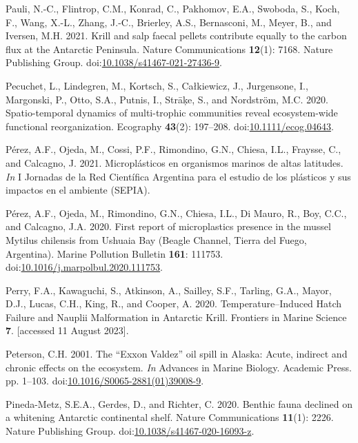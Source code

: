 \documentclass[
]{article}
\newlength{\cslhangindent}
\newenvironment{CSLReferences}[2] %
 {\begin{list}{}{%
  \setlength{\itemindent}{0pt}
  \setlength{\leftmargin}{0pt}
  \setlength{\parsep}{0pt}
  \ifodd #1
   \setlength{\leftmargin}{\cslhangindent}
   \setlength{\itemindent}{-1\cslhangindent}
  \fi
  \setlength{\itemsep}{#2\baselineskip}}}
 {\end{list}}
\begin{document}
\begin{CSLReferences}{1}{0}
Pauli, N.-C., Flintrop, C.M., Konrad, C., Pakhomov, E.A., Swoboda, S.,
Koch, F., Wang, X.-L., Zhang, J.-C., Brierley, A.S., Bernasconi, M.,
Meyer, B., and Iversen, M.H. 2021. Krill and salp faecal pellets
contribute equally to the carbon flux at the {Antarctic Peninsula}.
Nature Communications \textbf{12}(1): 7168. Nature Publishing Group.
doi:\href{https://doi.org/10.1038/s41467-021-27436-9}{10.1038/s41467-021-27436-9}.

Pecuchet, L., Lindegren, M., Kortsch, S., Całkiewicz, J., Jurgensone,
I., Margonski, P., Otto, S.A., Putnis, I., Strāķe, S., and Nordström,
M.C. 2020. Spatio-temporal dynamics of multi-trophic communities reveal
ecosystem-wide functional reorganization. Ecography \textbf{43}(2):
197--208.
doi:\href{https://doi.org/10.1111/ecog.04643}{10.1111/ecog.04643}.

Pérez, A.F., Ojeda, M., Cossi, P.F., Rimondino, G.N., Chiesa, I.L.,
Fraysse, C., and Calcagno, J. 2021. {Micropl{á}sticos en organismos
marinos de altas latitudes}. \emph{In} {I Jornadas de la Red
Cient{í}fica Argentina para el estudio de los pl{á}sticos y sus impactos
en el ambiente (SEPIA)}.

Pérez, A.F., Ojeda, M., Rimondino, G.N., Chiesa, I.L., Di Mauro, R.,
Boy, C.C., and Calcagno, J.A. 2020. First report of microplastics
presence in the mussel {Mytilus} chilensis from {Ushuaia Bay} ({Beagle
Channel}, {Tierra} del {Fuego}, {Argentina}). Marine Pollution Bulletin
\textbf{161}: 111753.
doi:\href{https://doi.org/10.1016/j.marpolbul.2020.111753}{10.1016/j.marpolbul.2020.111753}.

Perry, F.A., Kawaguchi, S., Atkinson, A., Sailley, S.F., Tarling, G.A.,
Mayor, D.J., Lucas, C.H., King, R., and Cooper, A. 2020.
Temperature--{Induced Hatch Failure} and {Nauplii Malformation} in
{Antarctic Krill}. Frontiers in Marine Science \textbf{7}. {[}accessed
11 August 2023{]}.

Peterson, C.H. 2001. The {``{Exxon Valdez}''} oil spill in {Alaska}:
{Acute}, indirect and chronic effects on the ecosystem. \emph{In}
Advances in {Marine Biology}. Academic Press. pp. 1--103.
doi:\href{https://doi.org/10.1016/S0065-2881(01)39008-9}{10.1016/S0065-2881(01)39008-9}.

Pineda-Metz, S.E.A., Gerdes, D., and Richter, C. 2020. Benthic fauna
declined on a whitening {Antarctic} continental shelf. Nature
Communications \textbf{11}(1): 2226. Nature Publishing Group.
doi:\href{https://doi.org/10.1038/s41467-020-16093-z}{10.1038/s41467-020-16093-z}.


\end{CSLReferences}
\end{document}
